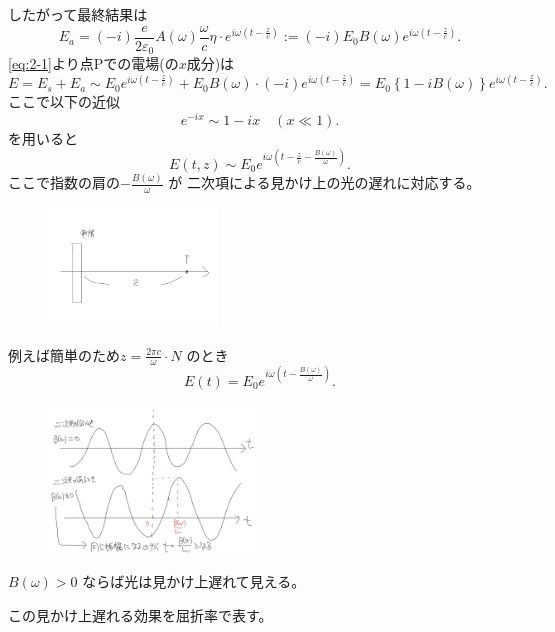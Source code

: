 \documentclass[dvipdfmx]{jsarticle}
\begin{document}
したがって最終結果は
\begin{equation}
\label{eq:2-9}
	E_a=(-i)\frac{e}{2\varepsilon_0}A(\omega) \frac{\omega}{c}\eta\cdot  e^{i\omega(t-\frac{z}{c})}:=(-i)E_0B(\omega)e^{i\omega(t-\frac{z}{c})}
.\end{equation}
\eqref{eq:2-1}より点Pでの電場(の$x$成分)は
\[
E=E_s+E_a\sim E_0e^{i\omega(t-\frac{z}{c})}+E_0B(\omega)\cdot (-i)e^{i\omega(t-\frac{z}{c})}=E_0\left\{ 1-iB(\omega) \right\} e^{i\omega(t-\frac{z}{c})}
.\] 
ここで以下の近似
\[
e^{-ix}\sim 1-ix\quad (x\ll 1)
.\] 
を用いると
\[
E(t,z)\sim E_0e^{i\omega(t-\frac{z}{c}-\frac{B(\omega)}{\omega})}
.\] 
ここで指数の肩の$-\frac{B(\omega)}{\omega}$ が
二次項による見かけ上の光の遅れに対応する。
\begin{figure}[H]
	\centering
	\includegraphics[width=0.4\textwidth]{fig2/Fig-6.jpg}
	\label{fig:fig2-Fig-6-jpg}
\end{figure}
例えば簡単のため$z= \frac{2\pi c}{\omega}\cdot N $ のとき
\begin{equation}
\label{eq:2-11}
	E(t)=E_0e^{i\omega(t-\frac{B(\omega)}{\omega})}
.\end{equation}
\begin{figure}[H]
	\centering
	\includegraphics[width=0.5\textwidth]{fig2/Fig-7.jpg}
	\label{fig:fig2-Fig-7-jpg}
\end{figure}
\begin{tcolorbox}[colback=green!10!white]
	$B(\omega)>0$ ならば光は見かけ上遅れて見える。
\end{tcolorbox}
この見かけ上遅れる効果を屈折率で表す。
\end{document}
